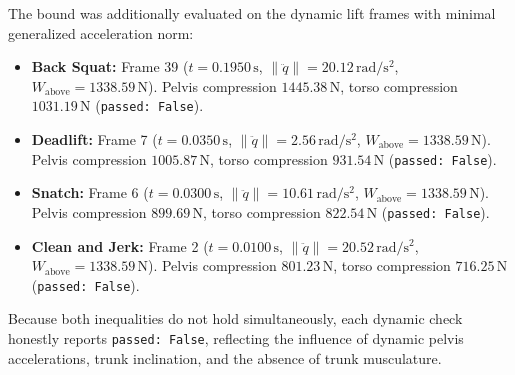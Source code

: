 \documentclass[11pt,a4paper]{article}
\begin{document}
The bound was additionally evaluated on the dynamic lift frames with minimal generalized acceleration norm:
\begin{itemize}[noitemsep]
\item \textbf{Back Squat:} Frame 39 ($t = 0.1950\,\mathrm{s}$, $\|\ddot{q}\| = 20.12\,\mathrm{rad/s^2}$, $W_{\text{above}} = 1338.59\,\mathrm{N}$). Pelvis compression $1445.38\,\mathrm{N}$, torso compression $1031.19\,\mathrm{N}$ (\texttt{passed: False}).
\item \textbf{Deadlift:} Frame 7 ($t = 0.0350\,\mathrm{s}$, $\|\ddot{q}\| = 2.56\,\mathrm{rad/s^2}$, $W_{\text{above}} = 1338.59\,\mathrm{N}$). Pelvis compression $1005.87\,\mathrm{N}$, torso compression $931.54\,\mathrm{N}$ (\texttt{passed: False}).
\item \textbf{Snatch:} Frame 6 ($t = 0.0300\,\mathrm{s}$, $\|\ddot{q}\| = 10.61\,\mathrm{rad/s^2}$, $W_{\text{above}} = 1338.59\,\mathrm{N}$). Pelvis compression $899.69\,\mathrm{N}$, torso compression $822.54\,\mathrm{N}$ (\texttt{passed: False}).
\item \textbf{Clean and Jerk:} Frame 2 ($t = 0.0100\,\mathrm{s}$, $\|\ddot{q}\| = 20.52\,\mathrm{rad/s^2}$, $W_{\text{above}} = 1338.59\,\mathrm{N}$). Pelvis compression $801.23\,\mathrm{N}$, torso compression $716.25\,\mathrm{N}$ (\texttt{passed: False}).
\end{itemize}
Because both inequalities do not hold simultaneously, each dynamic check honestly reports \texttt{passed: False}, reflecting the influence of dynamic pelvis accelerations, trunk inclination, and the absence of trunk musculature.
\end{document}

